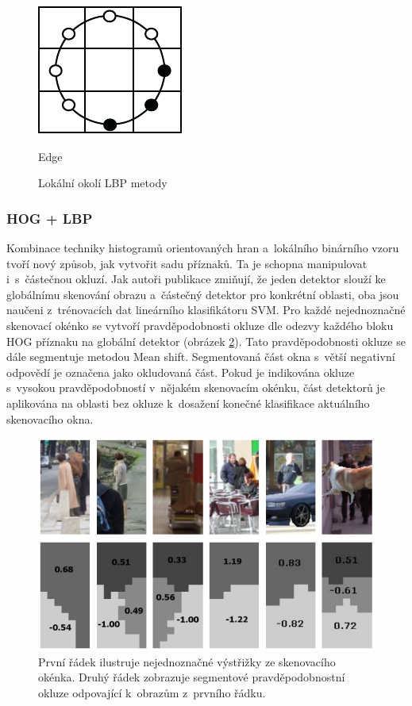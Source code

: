 \begin{figure}[H]
\begin{minipage}[b]{.18\textwidth}
  \includegraphics[width=.9\linewidth]{figures/lbp_edge}
  \caption*{Edge}
\end{minipage}
\caption{Lokální okolí LBP metody \cite{lbp:orig}}
\label{fig:lbpvzory}
\end{figure}

\subsubsection*{HOG + LBP}
Kombinace techniky histogramů orientovaných hran a~lokálního binárního vzoru tvoří nový způsob, jak vytvořit sadu příznaků. Ta je schopna manipulovat i~s~částečnou okluzí. Jak autoři publikace \cite{hoglpb} zmiňují, že jeden detektor slouží ke globálnímu skenování obrazu a~částečný detektor pro konkrétní oblasti, oba jsou naučeni z~trénovacích dat lineárního klasifikátoru SVM. Pro každé nejednoznačné skenovací okénko se vytvoří pravděpodobnosti okluze dle odezvy každého bloku HOG příznaku na globální detektor (obrázek \ref{fig:hoglbp}). Tato pravděpodobnosti okluze se dále segmentuje metodou Mean shift. Segmentovaná část okna s~větší negativní odpovědí je označena jako okludovaná část. Pokud je indikována okluze s~vysokou pravděpodobností v~nějakém skenovacím okénku, část detektorů je aplikována na oblasti bez okluze k~dosažení konečné klasifikace aktuálního skenovacího okna. 

\begin{figure}[H]
\centering
\includegraphics[width=.6\linewidth]{figures/hoglbp_obr}
\caption{ První řádek ilustruje nejednoznačné výstřižky ze skenovacího okénka. Druhý řádek zobrazuje segmentové pravděpodobnostní okluze odpovající k~obrazům z~prvního řádku.\cite{hoglpb}}
\label{fig:hoglbp}
\end{figure}

